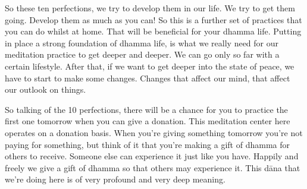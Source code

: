 \documentclass[letterpaper,10pt,english]{sphinxmanual}
\begin{document}
\sphinxAtStartPar
So these ten perfections, we try to develop them in our life. We try to
get them going. Develop them as much as you can! So this is a further set
of practices that you can do whilst at home. That will be beneficial for your
dhamma life. Putting in place a strong foundation of dhamma life, is what
we really need for our meditation practice to get deeper and deeper. We can
go only so far with a certain lifestyle. After that, if we want to get deeper
into the state of peace, we have to start to make some changes. Changes that
affect our mind, that affect our outlook on things.

\sphinxAtStartPar
So talking of the 10 perfections, there will be a chance for you to practice the first one tomorrow when you can give a donation. This meditation
center  here  operates  on  a  donation  basis.  When  you’re  giving  something
tomorrow you’re not paying for something, but think of it that you’re making
a gift of dhamma for others to receive. Someone else can experience it just
like you have. Happily and freely we give a gift of dhamma so that others
may experience it. This dāna that we’re doing here is of very profound and
very deep meaning.
\end{document}
